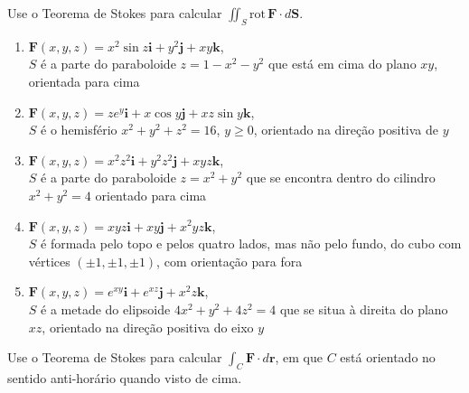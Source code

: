\documentclass[a4paper, 12pt]{article}
\begin{document}
	
	
	\vspace{5mm}
	
	Use o Teorema de Stokes para calcular $\displaystyle \iint_S \mathrm{rot} \, \textbf{F} \cdot d\textbf{S}$.
	
	\begin{enumerate}
		
		\item $\textbf{F}(x,y,z) = x^{2}\sin{z}\textbf{i} + y^{2}\textbf{j} + xy\textbf{k}$, \\ $S$ é a parte do paraboloide $z = 1 - x^2 - y^2$ que está em cima do plano $xy$, orientada para cima

		\item $\textbf{F}(x,y,z) = ze^{y}\textbf{i} + x\cos{y}\textbf{j} + xz\sin{y}\textbf{k}$, \\ $S$ é o hemisfério $x^2 + y^2 + z^2 = 16$, $y \geq 0$, orientado na direção positiva de $y$
		\resposta{$16\pi$}

		\item $\textbf{F}(x,y,z) = x^{2}z^{2}\textbf{i} + y^{2}z^{2}\textbf{j} + xyz\textbf{k}$, \\ $S$ é a parte do paraboloide $z = x^2 + y^2$ que se encontra dentro do cilindro $x^2 + y^2 = 4$ orientado para cima

		\item $\textbf{F}(x,y,z) = xyz\textbf{i} + xy\textbf{j} + x^{2}yz\textbf{k}$, \\ $S$ é formada pelo topo e pelos quatro lados, mas não pelo fundo, do cubo com vértices $(\pm 1, \pm 1, \pm 1)$, com orientação para fora

		\item $\textbf{F}(x,y,z) = e^{xy}\textbf{i} + e^{xz}\textbf{j} + x^{2}z\textbf{k}$, \\ $S$ é a metade do elipsoide $4x^2 + y^2 + 4z^2 = 4$ que se situa à direita do plano $xz$, orientado na direção positiva do eixo $y$

	\end{enumerate}
	
	\vspace{5mm}
	
	Use o Teorema de Stokes para calcular $\displaystyle \int_C \textbf{F} \cdot d\textbf{r}$, em que $C$ está orientado no sentido anti-horário quando visto de cima.
	
\end{document}

